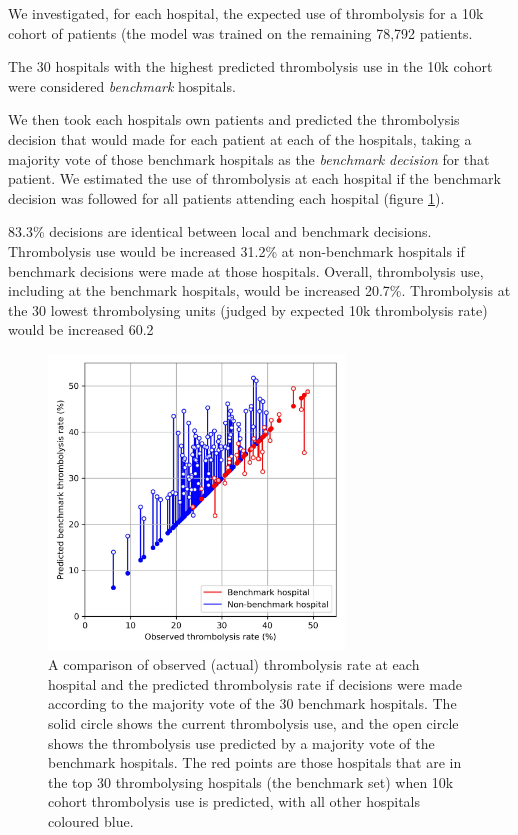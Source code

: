 We investigated, for each hospital, the expected use of thrombolysis for a 10k cohort of patients (the model was trained on the remaining 78,792 patients.

The 30 hospitals with the highest predicted thrombolysis use in the 10k cohort were considered \emph{benchmark} hospitals.

We then took each hospitals own patients and predicted the thrombolysis decision that would made for each patient at each of the hospitals, taking a majority vote of those benchmark hospitals as the \emph{benchmark decision} for that patient. We estimated the use of thrombolysis at each hospital if the benchmark decision was followed for all patients attending each hospital (figure \ref{fig:benchmark}).

83.3\% decisions are identical between local and benchmark decisions. Thrombolysis use would be increased 31.2\% at non-benchmark hospitals if benchmark decisions were made at those hospitals. Overall, thrombolysis use, including at the benchmark hospitals, would be increased 20.7\%. Thrombolysis at the 30 lowest thrombolysing units (judged by expected 10k thrombolysis rate) would be increased 60.2%


\begin{figure}
\centering
\includegraphics[width=0.7\textwidth]{./images/05_benchmark_thrombolysis_key_features}
\caption{A comparison of observed (actual) thrombolysis rate at each hospital and the predicted thrombolysis rate if decisions were made according to the majority vote of the 30 benchmark hospitals. The solid circle shows the current thrombolysis use, and the open circle shows the thrombolysis use predicted by a majority vote of the benchmark hospitals. The red points are those hospitals that are in the top 30 thrombolysing hospitals (the benchmark set) when 10k cohort thrombolysis use is predicted, with all other hospitals coloured blue.}
\label{fig:benchmark}
\end{figure}


